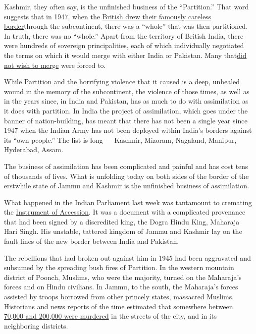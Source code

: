 Kashmir, they often say, is the unfinished business of the
``Partition.'' That word suggests that in 1947, when the
\href{https://www.nytimes.com/2017/08/18/opinion/india-pakistan-partition-imperial-britain.html}{British
drew their famously careless border}through the subcontinent, there was
a ``whole'' that was then partitioned. In truth, there was no ``whole.''
Apart from the territory of British India, there were hundreds of
sovereign principalities, each of which individually negotiated the
terms on which it would merge with either India or Pakistan. Many
that\href{https://www.bbc.co.uk/news/magazine-24159594}{did not wish to
merge} were forced to.

While Partition and the horrifying violence that it caused is a deep,
unhealed wound in the memory of the subcontinent, the violence of those
times, as well as in the years since, in India and Pakistan, has as much
to do with assimilation as it does with partition. In India the project
of assimilation, which goes under the banner of nation-building, has
meant that there has not been a single year since 1947 when the Indian
Army has not been deployed within India's borders against its ``own
people.'' The list is long --- Kashmir, Mizoram, Nagaland, Manipur,
Hyderabad, Assam.

The business of assimilation has been complicated and painful and has
cost tens of thousands of lives. What is unfolding today on both sides
of the border of the erstwhile state of Jammu and Kashmir is the
unfinished business of assimilation.

What happened in the Indian Parliament last week was tantamount to
cremating the
\href{https://thewire.in/history/public-first-time-jammu-kashmirs-instrument-accession-india}{Instrument
of Accession}. It was a document with a complicated provenance that had
been signed by a discredited king, the Dogra Hindu King, Maharaja Hari
Singh. His unstable, tattered kingdom of Jammu and Kashmir lay on the
fault lines of the new border between India and Pakistan.

The rebellions that had broken out against him in 1945 had been
aggravated and subsumed by the spreading bush fires of Partition. In the
western mountain district of Poonch, Muslims, who were the majority,
turned on the Maharaja's forces and on Hindu civilians. In Jammu, to the
south, the Maharaja's forces assisted by troops borrowed from other
princely states, massacred Muslims. Historians and news reports of the
time estimated that somewhere between
\href{https://kashmirlife.net/circa-1947-a-long-story-67652/}{70,000 and
200,000 were murdered} in the streets of the city, and in its
neighboring districts.

